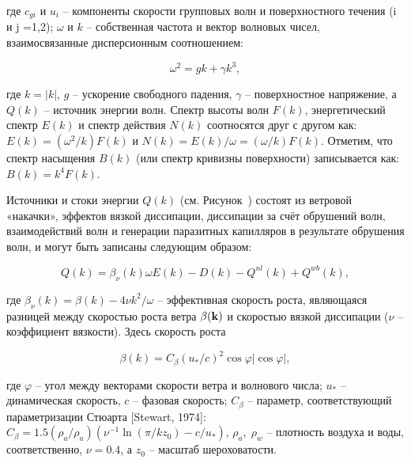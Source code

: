 где $c_{gi} $ и $u_{i} $ -- компоненты скорости групповых волн и поверхностного течения (i и j =1,2); $\omega $ и $k$ -- собственная частота и вектор волновых чисел, взаимосвязанные дисперсионным соотношением:



\begin{equation} \label{1.30)} \omega _{}^{2} =gk+\gamma k_{}^{3} , \end{equation} 



где $k=|k|$, $g$ -- ускорение свободного падения, $\gamma $ -- поверхностное напряжение, а $Q(k)$ -- источник энергии волн. Спектр высоты волн $F(k)$, энергетический спектр $E(k)$ и спектр действия $N(k)$ соотносятся друг с другом как: $E(k)=(\omega ^{2} /k)F(k)$ и $N(k)=E(k)/\omega =(\omega /k)F(k)$. Отметим, что спектр насыщения $B(k)$ (или спектр кривизны поверхности) записывается как: $B(k)=k^{4} F(k)$.

Источники и стоки энергии $Q(k)$ (см. Рисунок~) состоят из ветровой «накачки», эффектов вязкой диссипации, диссипации за счёт обрушений волн, взаимодействий волн и генерации паразитных капилляров в результате обрушения волн, и могут быть записаны следующим образом:



\begin{equation} \label{1.31)} Q(k)=\beta _{\nu } (k)\omega E(k)-D(k)-Q^{nl} (k)+Q^{wb} (k), \end{equation} 



где $\beta _{\nu } (k)=\beta (k)-4\nu k^{2} /\omega $ -- эффективная скорость роста, являющаяся разницей между скоростью роста ветра $\beta ({\bf k})$ и скоростью вязкой диссипации ($\nu $ -- коэффициент вязкости). Здесь скорость роста



\begin{equation} \label{1.32)} \beta (k)=C_{\beta } (u_{*} /c)^{2} \cos \varphi |\cos \varphi |, \end{equation} 



где $\varphi $ -- угол между векторами скорости ветра и волнового числа; $u_{*} $ -- динамическая скорость, $c$ -- фазовая скорость; $C_{\beta } $ -- параметр, соответствующий параметризации Стюарта [Stewart, 1974]: $C_{\beta } =1.5(\rho _{a} /\rho _{a} )(\nu ^{-1} \ln (\pi /kz_{0} )-c/u_{*} )$, $\rho _{a} ,\; \rho _{w} $ -- плотность воздуха и воды, соответственно, $\nu =0.4$, а $z_{0} $ -- масштаб шероховатости. 







